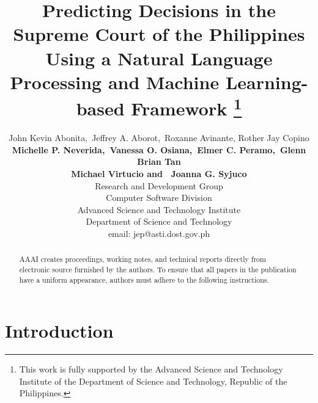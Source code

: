 \documentclass[letterpaper]{article} %
\begin{document}
%
\title{Predicting Decisions in the Supreme Court of the Philippines Using a Natural Language Processing and Machine Learning-based Framework \thanks{This work is fully supported by the Advanced Science and Technology Institute of the Department of Science and Technology, Republic of the Philippines.}}
\author{John Kevin Abonita,\ Jeffrey A. Aborot,\ Roxanne Avinante, Rother Jay Copino\\
{\bf Michelle P. Neverida,\ Vanessa O. Osiana,\ Elmer C. Peramo,\ Glenn Brian Tan}\\
{\bf Michael Virtucio and \ Joanna G. Syjuco}\\
Research and Development Group\\
Computer Software Division\\
Advanced Science and Technology Institute\\
Department of Science and Technology\\
email: jep@asti.dost.gov.ph
}
\maketitle

\begin{abstract}
AAAI creates proceedings, working notes, and technical reports directly from electronic source furnished by the authors. To ensure that all papers in the publication have a uniform appearance, authors must adhere to the following instructions. 
\end{abstract}

\section{Introduction}
\label{sec:introduction}


\end{document}
